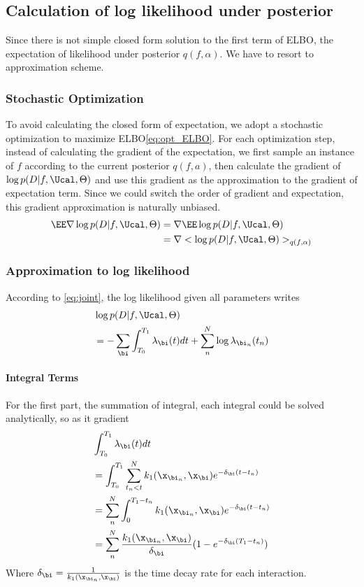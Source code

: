 {\subsection{Calculation of log likelihood under posterior}
Since there is not simple closed form solution to the first term of ELBO, \eg the expectation of likelihood under posterior $q(f, \alpha)$. We have to resort to approximation scheme.

\subsubsection{Stochastic Optimization}
To avoid calculating the closed form of expectation, we adopt a stochastic optimization to maximize ELBO\eqref{eq:opt_ELBO}. For each optimization step, instead of calculating the gradient of the expectation, we first sample an instance of $f$ according to the current posterior $q(f,a)$, then calculate the gradient of $ \log p( D | f, \Ucal, \Theta)$ and use this gradient as the approximation to the gradient of expectation term. Since we could switch the order of gradient and expectation, this gradient approximation is naturally unbiased.
\begin{align*}
	\EE \nabla \log p( D | f, \Ucal, \Theta) &=  \nabla \EE \log p( D | f, \Ucal, \Theta)\\
	&= \nabla < \log p( D | f, \Ucal, \Theta) >_{q( f, \alpha)}
\end{align*}

\subsubsection{ Approximation to log likelihood}
According to \eqref{eq:joint}, the log likelihood given all parameters writes
\begin{align}
	& \log p( D | f, \Ucal, \Theta) \notag\\
	&= -\sum_{\bi}\int_{T_0}^{T_1}\lambda_{\bi}(t)dt + \sum_{n}^{N} \log \lambda_{\bi_n}(t_n) \label{eq:log_llk}
\end{align}

\paragraph{Integral Terms}For the first part, the summation of integral, each integral could be solved analytically, so as it gradient
\begin{align}
	&\int_{T_0}^{T_1}\lambda_{\bi}(t)dt \notag \\
	&=\int_{T_0}^{T_1} \sum_{t_n < t}^N k_1( \x_{\bi_n}, \x_{\bi}) e^{- \delta_{\bi} ( t - t_n)} \notag \\
	&= \sum_{n}^{N} \int_{0}^{T_1 - t_n} k_1( \x_{\bi_n}, \x_{\bi})  e^{- \delta_{\bi} ( t - t_n)} \notag\\
	&= \sum_{n}^{N} \frac{ k_1( \x_{\bi_n}, \x_{\bi})}{ \delta_{\bi}}( 1 - e^{ -\delta_{\bi}( T_1 - t_n)}) \label{eq:int_term}
\end{align} 
Where $\delta_{\bi} = \frac{1}{k_1( \x_{\bi_n}, \x_{\bi})}$ is the time decay rate for each interaction. 

}
